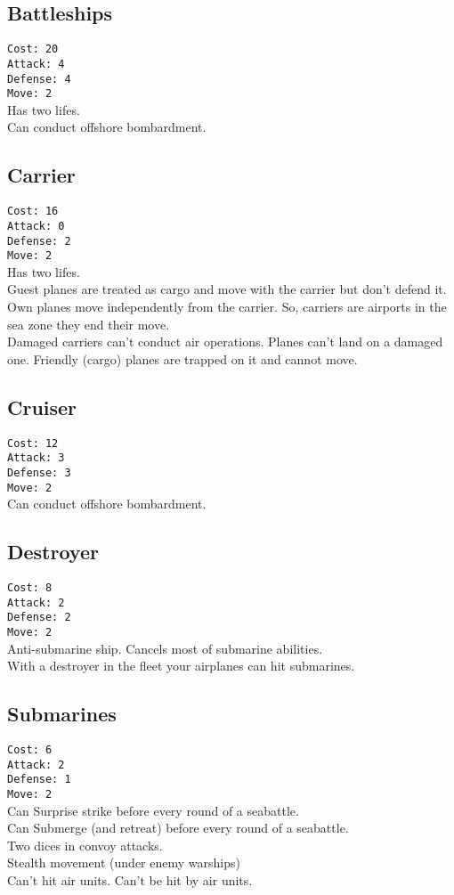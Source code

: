 \documentclass[10pt,twoside]{article}
\begin{document}
\begin{multicols*}{3}
\subsection*{Battleships}
\texttt{Cost: 20 \\ Attack: 4 \\ Defense: 4 \\ Move: 2}
\\
Has two lifes.\\
Can conduct offshore bombardment.

\subsection*{Carrier}
\texttt{Cost: 16 \\ Attack: 0 \\ Defense: 2 \\ Move: 2}
\\
Has two lifes.\\
Guest planes are treated as cargo and move with the carrier but don't defend it. Own planes move independently from the carrier. So, carriers are airports in the sea zone they end their move.\\
Damaged carriers can't conduct air operations. Planes can't land on a damaged one. Friendly (cargo) planes are trapped on it and cannot move.

\subsection*{Cruiser}
\texttt{Cost: 12 \\ Attack: 3 \\ Defense: 3 \\ Move: 2}
\\
Can conduct offshore bombardment.

\subsection*{Destroyer}
\texttt{Cost: 8 \\ Attack: 2 \\ Defense: 2 \\ Move: 2}
\\
Anti-submarine ship. Cancels most of submarine abilities.\\
With a destroyer in the fleet your airplanes can hit submarines.

\subsection*{Submarines}
\texttt{Cost: 6 \\ Attack: 2 \\ Defense: 1 \\ Move: 2}
\\
Can Surprise strike before every round of a seabattle.\\
Can Submerge (and retreat) before every round of a seabattle.\\
Two dices in convoy attacks.\\
Stealth movement (under enemy warships)\\
Can't hit air units. Can't be hit by air units.



\end{multicols*}
\end{document}
